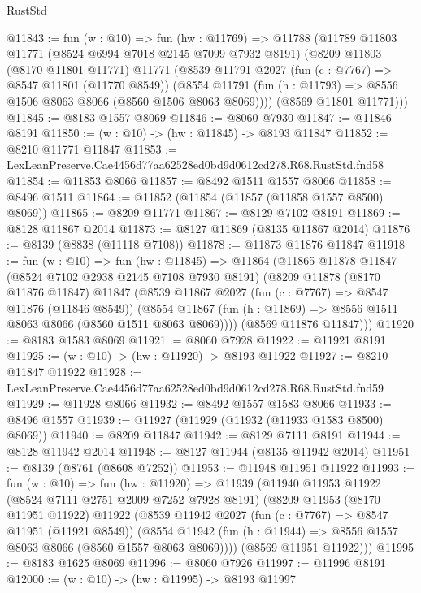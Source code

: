 \begin{lexlean}{RustStd}
\begin{coremodule}
@11843 := fun (w : @10) =>
  fun (hw : @11769) =>
  @11788
    (@11789
      @11803
      @11771
      (@8524 @6994 @7018 @2145 @7099 @7932 @8191)
      (@8209
        @11803
        (@8170 @11801 @11771)
        @11771
        (@8539
          @11791
          @2027
          (fun (c : @7767) => @8547 @11801 (@11770 @8549))
          (@8554 @11791 (fun (h : @11793) => @8556 @1506 @8063 @8066 (@8560 @1506 @8063 @8069))))
        (@8569 @11801 @11771)))
@11845 := @8183 @1557 @8069
@11846 := @8060 @7930
@11847 := @11846 @8191
@11850 := (w : @10) -> (hw : @11845) -> @8193 @11847
@11852 := @8210 @11771 @11847
@11853 := LexLeanPreserve.Cae4456d77aa62528ed0bd9d0612cd278.R68.RustStd.fnd58
@11854 := @11853 @8066
@11857 := @8492 @1511 @1557 @8066
@11858 := @8496 @1511
@11864 := @11852 (@11854 (@11857 (@11858 @1557 @8500) @8069))
@11865 := @8209 @11771
@11867 := @8129 @7102 @8191
@11869 := @8128 @11867 @2014
@11873 := @8127 @11869 (@8135 @11867 @2014)
@11876 := @8139 (@8838 (@11118 @7108))
@11878 := @11873 @11876 @11847
@11918 := fun (w : @10) =>
  fun (hw : @11845) =>
  @11864
    (@11865
      @11878
      @11847
      (@8524 @7102 @2938 @2145 @7108 @7930 @8191)
      (@8209
        @11878
        (@8170 @11876 @11847)
        @11847
        (@8539
          @11867
          @2027
          (fun (c : @7767) => @8547 @11876 (@11846 @8549))
          (@8554 @11867 (fun (h : @11869) => @8556 @1511 @8063 @8066 (@8560 @1511 @8063 @8069))))
        (@8569 @11876 @11847)))
@11920 := @8183 @1583 @8069
@11921 := @8060 @7928
@11922 := @11921 @8191
@11925 := (w : @10) -> (hw : @11920) -> @8193 @11922
@11927 := @8210 @11847 @11922
@11928 := LexLeanPreserve.Cae4456d77aa62528ed0bd9d0612cd278.R68.RustStd.fnd59
@11929 := @11928 @8066
@11932 := @8492 @1557 @1583 @8066
@11933 := @8496 @1557
@11939 := @11927 (@11929 (@11932 (@11933 @1583 @8500) @8069))
@11940 := @8209 @11847
@11942 := @8129 @7111 @8191
@11944 := @8128 @11942 @2014
@11948 := @8127 @11944 (@8135 @11942 @2014)
@11951 := @8139 (@8761 (@8608 @7252))
@11953 := @11948 @11951 @11922
@11993 := fun (w : @10) =>
  fun (hw : @11920) =>
  @11939
    (@11940
      @11953
      @11922
      (@8524 @7111 @2751 @2009 @7252 @7928 @8191)
      (@8209
        @11953
        (@8170 @11951 @11922)
        @11922
        (@8539
          @11942
          @2027
          (fun (c : @7767) => @8547 @11951 (@11921 @8549))
          (@8554 @11942 (fun (h : @11944) => @8556 @1557 @8063 @8066 (@8560 @1557 @8063 @8069))))
        (@8569 @11951 @11922)))
@11995 := @8183 @1625 @8069
@11996 := @8060 @7926
@11997 := @11996 @8191
@12000 := (w : @10) -> (hw : @11995) -> @8193 @11997

\end{coremodule}
\end{lexlean}
